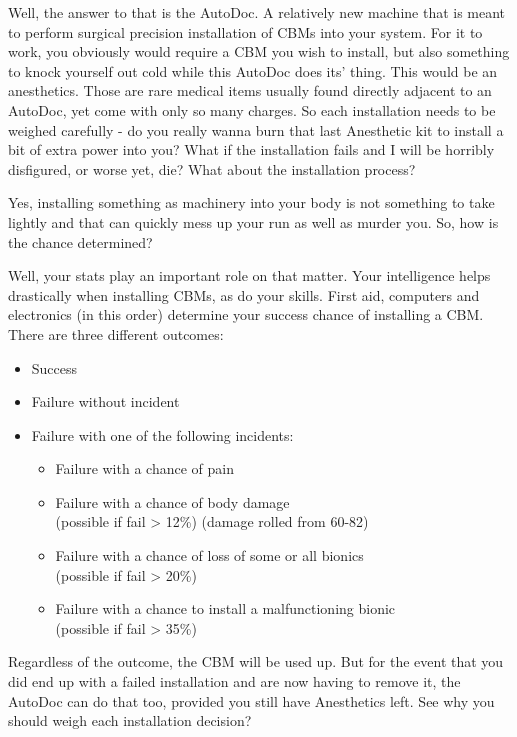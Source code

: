 Well, the answer to that is the AutoDoc. A relatively new machine that is meant to perform surgical precision installation of CBMs into your system. For it to work, you obviously would require a CBM you wish to install, but also something to knock yourself out cold while this AutoDoc does its' thing. This would be an anesthetics. Those are rare medical items usually found directly adjacent to an AutoDoc, yet come with only so many charges. So each installation needs to be weighed carefully - do you really wanna burn that last Anesthetic kit to install a bit of extra power into you? What if the installation fails and I will be horribly disfigured, or worse yet, die? What about the installation process?

Yes, installing something as machinery into your body is not something to take lightly and that can quickly mess up your run as well as murder you. So, how is the chance determined?

Well, your stats play an important role on that matter. Your intelligence helps drastically when installing CBMs, as do your skills. First aid, computers and electronics (in this order) determine your success chance of installing a CBM. There are three different outcomes:

\begin{itemize}
\item Success
\item Failure without incident
\item Failure with one of the following incidents:
\begin{itemize}
\item Failure with a chance of pain
\item Failure with a chance of body damage\\(possible if fail > 12\%) (damage rolled from 60-82)
\item Failure with a chance of loss of some or all bionics\\(possible if fail > 20\%)
\item Failure with a chance to install a malfunctioning bionic\\ (possible if fail > 35\%)
\end{itemize}
\end{itemize}
    
Regardless of the outcome, the CBM will be used up. But for the event that you did end up with a failed installation and are now having to remove it, the AutoDoc can do that too, provided you still have Anesthetics left. See why you should weigh each installation decision?

